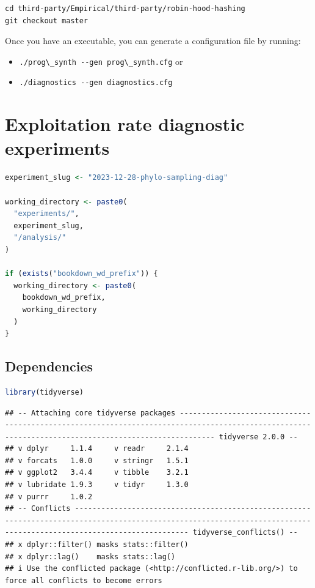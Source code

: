 \documentclass[
]{book}
\newcommand{\passthrough}[1]{#1}
\providecommand{\tightlist}{%
  \setlength{\itemsep}{0pt}\setlength{\parskip}{0pt}}
\begin{document}
\begin{lstlisting}
cd third-party/Empirical/third-party/robin-hood-hashing
git checkout master
\end{lstlisting}

Once you have an executable, you can generate a configuration file by running:

\begin{itemize}
\tightlist
\item
  \passthrough{\lstinline!./prog\_synth --gen prog\_synth.cfg!} or
\item
  \passthrough{\lstinline!./diagnostics --gen diagnostics.cfg!}
\end{itemize}

\hypertarget{exploitation-rate-diagnostic-experiments}{%
\chapter{Exploitation rate diagnostic experiments}\label{exploitation-rate-diagnostic-experiments}}

\begin{lstlisting}[language=R]
experiment_slug <- "2023-12-28-phylo-sampling-diag"

working_directory <- paste0(
  "experiments/",
  experiment_slug,
  "/analysis/"
)

if (exists("bookdown_wd_prefix")) {
  working_directory <- paste0(
    bookdown_wd_prefix,
    working_directory
  )
}
\end{lstlisting}

\hypertarget{dependencies}{%
\section{Dependencies}\label{dependencies}}

\begin{lstlisting}[language=R]
library(tidyverse)
\end{lstlisting}

\begin{lstlisting}
## -- Attaching core tidyverse packages ---------------------------------------------------------------------------------------------------------------------------------------------------- tidyverse 2.0.0 --
## v dplyr     1.1.4     v readr     2.1.4
## v forcats   1.0.0     v stringr   1.5.1
## v ggplot2   3.4.4     v tibble    3.2.1
## v lubridate 1.9.3     v tidyr     1.3.0
## v purrr     1.0.2     
## -- Conflicts ---------------------------------------------------------------------------------------------------------------------------------------------------------------------- tidyverse_conflicts() --
## x dplyr::filter() masks stats::filter()
## x dplyr::lag()    masks stats::lag()
## i Use the conflicted package (<http://conflicted.r-lib.org/>) to force all conflicts to become errors
\end{lstlisting}
\end{document}
